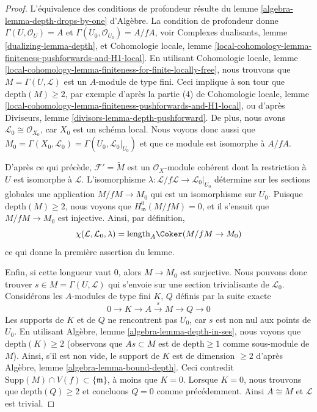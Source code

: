 \begin{proof}
L'équivalence des conditions de profondeur résulte du
lemme \ref{algebra-lemma-depth-drops-by-one} d'Algèbre.
La condition de profondeur donne
$\Gamma(U, \mathcal{O}_U) = A$ et
$\Gamma(U_0, \mathcal{O}_{U_0}) = A/fA$, voir
Complexes dualisants, lemme \ref{dualizing-lemma-depth}, et
Cohomologie locale, lemme
\ref{local-cohomology-lemma-finiteness-pushforwards-and-H1-local}.
En utilisant Cohomologie locale, lemme
\ref{local-cohomology-lemma-finiteness-for-finite-locally-free},
nous trouvons que $M = \Gamma(U, \mathcal{L})$ est un $A$-module de type fini.
Ceci implique à son tour que $\text{depth}(M) \geq 2$, par exemple d'après la
partie (4) de Cohomologie locale, lemme
\ref{local-cohomology-lemma-finiteness-pushforwards-and-H1-local},
ou d'après Diviseurs, lemme \ref{divisors-lemma-depth-pushforward}.
De plus, nous avons $\mathcal{L}_0 \cong \mathcal{O}_{X_0}$,
car $X_0$ est un schéma local. Nous voyons donc aussi que
$M_0 = \Gamma(X_0, \mathcal{L}_0) = \Gamma(U_0, \mathcal{L}_0|_{U_0})$
et que ce module est isomorphe à $A/fA$.

\medskip\noindent
D'après ce qui précède, $\mathcal{F}' = \widetilde{M}$ est un
$\mathcal{O}_X$-module cohérent dont la restriction à $U$ est isomorphe à $\mathcal{L}$.
L'isomorphisme $\lambda : \mathcal{L}/f\mathcal{L} \to \mathcal{L}_0|_{U_0}$
détermine sur les sections globales une application $M/fM \to M_0$
qui est un isomorphisme sur $U_0$.
Puisque $\text{depth}(M) \geq 2$, nous voyons
que $H^0_\mathfrak m(M/fM) = 0$, et il s'ensuit que
$M/fM \to M_0$ est injective. Ainsi, par définition,
$$
\chi(\mathcal{L}, \mathcal{L}_0, \lambda) =
\text{length}_A \Coker(M/fM \to M_0)
$$
ce qui donne la première assertion du lemme.

\medskip\noindent
Enfin, si cette longueur vaut $0$, alors $M \to M_0$ est surjective.
Nous pouvons donc trouver $s \in M = \Gamma(U, \mathcal{L})$
qui s'envoie sur une section trivialisante de $\mathcal{L}_0$.
Considérons les $A$-modules de type fini $K$, $Q$ définis par la suite
exacte
$$
0 \to K \to A \xrightarrow{s} M \to Q \to 0
$$
Les supports de $K$ et de $Q$ ne rencontrent pas $U_0$, car $s$
est non nul aux points de $U_0$. En utilisant
Algèbre, lemme \ref{algebra-lemma-depth-in-ses},
nous voyons que $\text{depth}(K) \geq 2$ (observons que
$As \subset M$ est de $\text{depth} \geq 1$ comme sous-module de $M$).
Ainsi, s'il est non vide, le support de $K$ est de dimension $\geq 2$ d'après
Algèbre, lemme \ref{algebra-lemma-bound-depth}.
Ceci contredit $\text{Supp}(M) \cap V(f) \subset \{\mathfrak m\}$,
à moins que $K = 0$. Lorsque $K = 0$, nous trouvons que
$\text{depth}(Q) \geq 2$ et concluons
$Q = 0$ comme précédemment. Ainsi $A \cong M$ et
$\mathcal{L}$ est trivial.
\end{proof}








